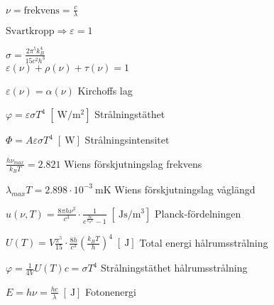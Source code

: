 \documentclass[10pt,landscape]{article}
\newcommand{\unit}[1]{
\;[\SI{}{#1}]
}
\begin{document}
\begin{multicols}{3}
$\nu = \text{frekvens} = \frac{c}{\lambda}$

$\text{Svartkropp} \Rightarrow \varepsilon = 1$

$\sigma = \frac{2\pi^5 k_B^4}{15 c^2 h^3}$
$$$$
$\varepsilon(\nu) + \rho(\nu) + \tau(\nu) = 1$

$\varepsilon(\nu) = \alpha(\nu) $  \hfill Kirchoffs lag


$\varphi = \varepsilon \sigma T^4 \unit{\watt\per\meter^2}$  \hfill Strålningstäthet


$\Phi = A \varepsilon \sigma T^4 \unit{\watt}$  \hfill Strålningsintensitet


$\frac{h\nu_{max}}{k_B T} = 2.821$  \hfill Wiens förskjutningslag frekvens


$\lambda_{max}T = 2.898\cdot 10^{-3} \SI{}{\meter\kelvin}$  \hfill Wiens förskjutningslag våglängd

$\displaystyle u(\nu, T) = \frac{8\pi h \nu^3}{c^3} \cdot \frac{1}{e^{\frac{h\nu}{k_BT}} - 1} \unit{\joule\second\per\cubic\meter}$  \hfill Planck-fördelningen


$\displaystyle U(T) = V \frac{\pi^5}{15} \cdot \frac{8h}{c^3}\left(\frac{k_BT}{h}\right)^4 \unit{\joule}$  \hfill Total energi hålrumsstrålning


$\varphi = \frac{1}{4V} U(T)c = \sigma T^4$  \hfill Strålningstäthet hålrumsstrålning


$E = h\nu = \frac{hc}{\lambda} \unit{\joule}$  \hfill Fotonenergi


\end{multicols}
\end{document}
